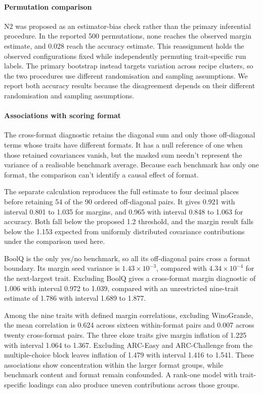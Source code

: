 \paragraph{Permutation comparison}
N2 was proposed as an estimator-bias check rather than the primary inferential procedure. In the reported 500 permutations, none reaches the observed margin estimate, and 0.028 reach the accuracy estimate. This reassignment holds the observed configurations fixed while independently permuting trait-specific run labels. The primary bootstrap instead targets variation across recipe clusters, so the two procedures use different randomisation and sampling assumptions. We report both accuracy results because the disagreement depends on their different randomisation and sampling assumptions.

\paragraph{Associations with scoring format}
The cross-format diagnostic retains the diagonal sum and only those off-diagonal terms whose traits have different formats. It has a null reference of one when those retained covariances vanish, but the masked sum needn't represent the variance of a realisable benchmark average. Because each benchmark has only one format, the comparison can't identify a causal effect of format.

The separate calculation reproduces the full estimate to four decimal places before retaining 54 of the 90 ordered off-diagonal pairs. It gives 0.921 with interval 0.801 to 1.035 for margins, and 0.965 with interval 0.848 to 1.063 for accuracy. Both fall below the proposed 1.2 threshold, and the margin result falls below the 1.153 expected from uniformly distributed covariance contributions under the comparison used here.

BoolQ is the only yes/no benchmark, so all its off-diagonal pairs cross a format boundary. Its margin seed variance is $1.43\times10^{-3}$, compared with $4.34\times10^{-4}$ for the next-largest trait. Excluding BoolQ gives a cross-format margin diagnostic of 1.006 with interval 0.972 to 1.039, compared with an unrestricted nine-trait estimate of 1.786 with interval 1.689 to 1.877.

Among the nine traits with defined margin correlations, excluding WinoGrande, the mean correlation is 0.624 across sixteen within-format pairs and 0.007 across twenty cross-format pairs. The three cloze traits give margin inflation of 1.225 with interval 1.064 to 1.367. Excluding ARC-Easy and ARC-Challenge from the multiple-choice block leaves inflation of 1.479 with interval 1.416 to 1.541. These associations show concentration within the larger format groups, while benchmark content and format remain confounded. A rank-one model with trait-specific loadings can also produce uneven contributions across those groups.

